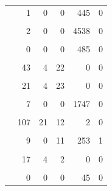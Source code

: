 \documentclass[12pt]{article}
\begin{document}
\begin{longtable*}{rrrrrr}
\midrule\addlinespace[2.5pt]
 \\ 
\midrule{} & 1 & 0 & 0 & 445 & 0 \\ 
\midrule\addlinespace[2.5pt]
 \\ 
\midrule{} & 2 & 0 & 0 & 4538 & 0 \\ 
\midrule\addlinespace[2.5pt]
 \\ 
\midrule{} & 0 & 0 & 0 & 485 & 0 \\ 
\midrule\addlinespace[2.5pt]
 \\ 
\midrule{} & 43 & 4 & 22 & 0 & 0 \\ 
\midrule\addlinespace[2.5pt]
 \\ 
\midrule{} & 21 & 4 & 23 & 0 & 0 \\ 
\midrule\addlinespace[2.5pt]
 \\ 
\midrule{} & 7 & 0 & 0 & 1747 & 0 \\ 
\midrule\addlinespace[2.5pt]
 \\ 
\midrule{} & 107 & 21 & 12 & 2 & 0 \\ 
\midrule\addlinespace[2.5pt]
 \\ 
\midrule{} & 9 & 0 & 11 & 253 & 1 \\ 
\midrule\addlinespace[2.5pt]
 \\ 
\midrule{} & 17 & 4 & 2 & 0 & 0 \\ 
\midrule\addlinespace[2.5pt]
 \\ 
\midrule{} & 0 & 0 & 0 & 45 & 0 \\ 
\bottomrule
\end{longtable*}
\end{document}
